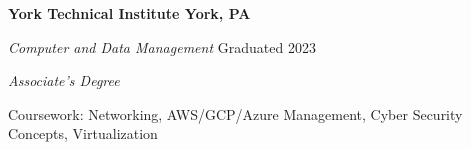 \textbf{York Technical Institute \hfill York, PA} \par
\textit{Computer and Data Management} \hfill Graduated 2023\par
\textit{Associate's Degree} \par 
Coursework: Networking, AWS/GCP/Azure Management, Cyber Security Concepts, Virtualization \par
